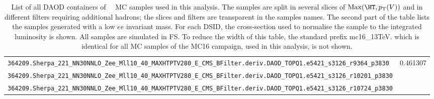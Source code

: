 \begin{table}[htbp]
{\begin{tabular}{l|r}
\verb|364209.Sherpa_221_NN30NNLO_Zee_Mll10_40_MAXHTPTV280_E_CMS_BFilter.deriv.DAOD_TOPQ1.e5421_s3126_r9364_p3830|  & \multirow{3}{*}{0.461307} \\
\verb|364209.Sherpa_221_NN30NNLO_Zee_Mll10_40_MAXHTPTV280_E_CMS_BFilter.deriv.DAOD_TOPQ1.e5421_s3126_r10201_p3830| & \\
\verb|364209.Sherpa_221_NN30NNLO_Zee_Mll10_40_MAXHTPTV280_E_CMS_BFilter.deriv.DAOD_TOPQ1.e5421_s3126_r10724_p3830| & \\ \hline

\bottomrule
\end{tabular}}
  \caption{
    List of all DAOD containers of \Zee\ \sherpa\ MC samples used in this analysis.
    The samples are split in several slices of $\mathrm{Max}(\HT,\pT(V))$ and in different filters requiring additional hadrons;
    the slices and filters are transparent in the samples names.
    The second part of the table lists the samples generated with a low $ee$ invariant mass.
    For each DSID, the cross-section used to normalise the sample to the integrated luminosity is shown.
    All samples are simulated in FS.
    To reduce the width of this table, the standard prefix \textsf{mc16\_13TeV.} which is identical for all MC samples of the MC16 campaign, used in this analysis, is not shown.
  }
  \label{tab:MC_samples_Zee}
\end{table}




